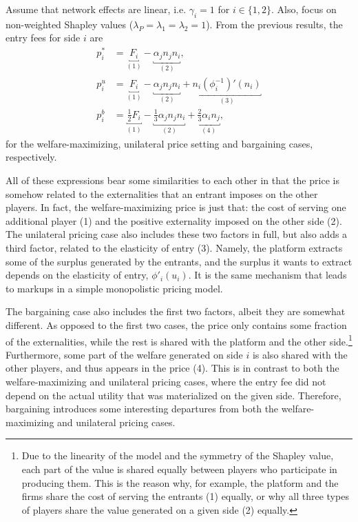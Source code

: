 \documentclass[a4paper]{article}
\begin{document}
Assume that network effects are linear, i.e. $\gamma_i = 1$ for $i \in \{1, 2\}$.
Also, focus on non-weighted Shapley values ($\lambda_P = \lambda_1 = \lambda_2 = 1$).
From the previous results, the entry fees for side $i$ are
\begin{align*}
    p_i^* &= \underbracket{F_i}_{(1)} - \underbracket{\alpha_j n_j n_i}_{(2)}, \\
    p_i^u &= \underbracket{F_i}_{(1)} - \underbracket{\alpha_j n_j n_i}_{(2)} + \underbracket{n_i (\phi_i^{-1})'(n_i)}_{(3)} \\
    p_i^b &= \underbracket{\frac{1}{2} F_i}_{(1)} - \underbracket{\frac{1}{3} \alpha_j n_j n_i}_{(2)} + \underbracket{\frac{2}{3} \alpha_i n_j}_{(4)},
\end{align*}
for the welfare-maximizing, unilateral price setting and bargaining cases, respectively.

All of these expressions bear some similarities to each other in that the price is somehow related to the externalities that an entrant imposes on the other players.
In fact, the welfare-maximizing price is just that: the cost of serving one additional player (1) and the positive externality imposed on the other side (2).
The unilateral pricing case also includes these two factors in full, but also adds a third factor, related to the elasticity of entry (3).
Namely, the platform extracts some of the surplus generated by the entrants, and the surplus it wants to extract depends on the elasticity of entry, $\phi'_i(u_i)$.
It is the same mechanism that leads to markups in a simple monopolistic pricing model.

The bargaining case also includes the first two factors, albeit they are somewhat different.
As opposed to the first two cases, the price only contains some fraction of the externalities, while the rest is shared with the platform and the other side.\footnote{
    Due to the linearity of the model and the symmetry of the Shapley value, each part of the value is shared equally between players who participate in producing them.
    This is the reason why, for example, the platform and the firms share the cost of serving the entrants (1) equally, or why all three types of players share the value generated on a given side (2) equally.
}
Furthermore, some part of the welfare generated on side $i$ is also shared with the other players, and thus appears in the price (4).
This is in contrast to both the welfare-maximizing and unilateral pricing cases, where the entry fee did not depend on the actual utility that was materialized on the given side.
Therefore, bargaining introduces some interesting departures from both the welfare-maximizing and unilateral pricing cases.
\end{document}
